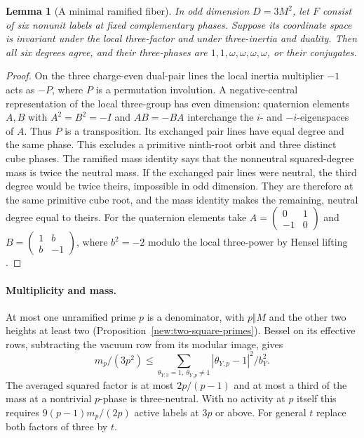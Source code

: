 \documentclass[11pt]{amsart}
\numberwithin{equation}{section}
\newtheorem{lemma}[theorem]{Lemma}
\theoremstyle{definition}
\theoremstyle{plain}
\begin{document}
\begin{lemma}[A minimal ramified fiber]\label{r7:six-fiber}
In odd dimension $D=3M^2$, let $F$ consist of six nonunit labels
at fixed complementary phases. Suppose its coordinate space is
invariant under the local three-factor and under three-inertia and
duality. Then all six degrees agree, and their three-phases are
$1,1,\omega,\omega,\omega,\omega$, or their conjugates.
\end{lemma}
\begin{proof}
On the three charge-even dual-pair lines the local inertia
multiplier $-1$ acts as $-P$, where $P$ is a permutation involution.
A negative-central representation of the local three-group has even
dimension: quaternion elements $A,B$ with
$A^2=B^2=-I$ and $AB=-BA$ interchange the $i$- and $-i$-eigenspaces
of $A$. Thus $P$ is a transposition. Its exchanged pair lines have
equal degree and the same phase. This excludes a primitive ninth-root
orbit and three distinct cube phases. The ramified mass identity
says that the nonneutral squared-degree mass is twice the neutral
mass. If the exchanged pair lines were neutral, the third degree
would be twice theirs, impossible in odd dimension. They are
therefore at the same primitive cube root, and the mass identity
makes the remaining, neutral degree equal to theirs.
For the quaternion elements take
$A=\left(\begin{smallmatrix}0&1\\-1&0\end{smallmatrix}\right)$ and
$B=\left(\begin{smallmatrix}1&b\\b&-1\end{smallmatrix}\right)$,
where $b^2=-2$ modulo the local three-power by Hensel lifting
\cite{SerreLocal}.
\end{proof}

\paragraph{Multiplicity and mass.}
At most one unramified prime $p$ is a denominator, with $p\Vert M$ and
the other two heights at least two (Proposition~\ref{new:two-square-primes}).
Bessel on its effective rows, subtracting the vacuum row from its modular
image, gives
\[
 m_p/(3p^2)\le\sum_{\theta_{Y,3}=1,\ \theta_{Y,p}\ne1}
                     |\theta_{Y,p}-1|^2/b_Y^2.
\]
The averaged squared factor is at most $2p/(p-1)$ and at most a third
of the mass at a nontrivial $p$-phase is three-neutral. With no activity
at $p$ itself this requires $9(p-1)m_p/(2p)$ active labels at $3p$ or
above. For general $t$ replace both factors of three by $t$.
\end{document}
